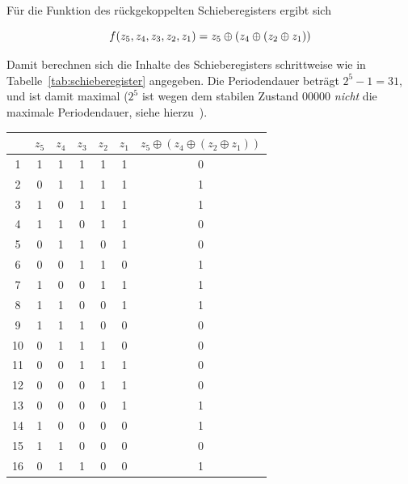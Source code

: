 \noindent
Für die Funktion des  rückgekoppelten Schieberegisters ergibt sich

\begin{equation}\notag
f(z_5, z_4, z_3, z_2, z_1) = z_5 \oplus (z_4 \oplus (z_2 \oplus z_1))
\end{equation}


\noindent
Damit berechnen sich die Inhalte des Schieberegisters schrittweise wie in Tabelle~\ref{tab:schieberegister} angegeben.
Die Periodendauer beträgt $2^5 - 1 = 31$, und ist damit maximal ($2^5$ ist wegen dem stabilen Zustand $00000$ \textit{nicht} die maximale Periodendauer, siehe hierzu~\cite[\textbf{Lösung zu Aufgabe 6.2}, 111]{ITS3}).

\begin{table}[h!]
    \centering
    \setlength{\tabcolsep}{0.5em}
    \begin{tabular}{|c|c|c|c|c|c|c|}
        \hline
        \textbf{} & \textbf{$z_5$} & \textbf{$z_4$} & \textbf{$z_3$} & \textbf{$z_2$} & \textbf{$z_1$} & \textbf{$z_5 \oplus (z_4 \oplus (z_2 \oplus z_1))$} \\
        \hline
        1 &  1 & 1 & 1 & 1 & 1 & 0 \\
        \hline
        2 &  0 & 1 & 1 & 1 & 1 & 1 \\
        \hline
        3 &  1 & 0 & 1 & 1 & 1 & 1 \\
        \hline
        4 &  1 & 1 & 0 & 1 & 1 & 0 \\
        \hline
        5 &  0 & 1 & 1 & 0 & 1 & 0 \\
        \hline
        6 &  0 & 0 & 1 & 1 & 0 & 1 \\
        \hline
        7 &  1 & 0 & 0 & 1 & 1 & 1 \\
        \hline
        8 &  1 & 1 & 0 & 0 & 1 & 1 \\
        \hline
        9 &  1 & 1 & 1 & 0 & 0 & 0 \\
        \hline
        10 &  0 & 1 & 1 & 1 & 0 & 0 \\
        \hline
        11 &  0 & 0 & 1 & 1 & 1 & 0 \\
        \hline
        12 &  0 & 0 & 0 & 1 & 1 & 0 \\
        \hline
        13 &  0 & 0 & 0 & 0 & 1 & 1 \\
        \hline
        14 &  1 & 0 & 0 & 0 & 0 & 1 \\
        \hline
        15 &  1 & 1 & 0 & 0 & 0 & 0\\
        \hline
        16 &  0 & 1 & 1 & 0 & 0 & 1 \\

\end{tabular}
\end{table}
